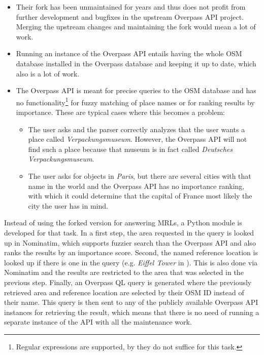 \begin{itemize}
\item Their fork has been unmaintained for years and thus does not profit from
  further development and bugfixes in the upstream Overpass API project. Merging
  the upstream changes and maintaining the fork would mean a lot of work.
\item Running an instance of the Overpass API entails having the whole OSM
  database installed in the Overpass database and keeping it up to date, which
  also is a lot of work.
\item The Overpass API is meant for precise queries to the OSM database and has
  no functionality\footnote{Regular expressions are supported, by they do not
    suffice for this task.} for fuzzy matching of place names or for ranking
  results by importance. These are typical cases where this becomes a problem:
  \begin{itemize}
  \item The user asks  and the parser
    correctly analyzes that the user wants a place called
    \emph{Verpackungsmuseum}. However, the Overpass API will not find such a
    place because that museum is in fact called \emph{Deutsches
      Verpackungsmuseum}.
  \item The user asks for objects in \emph{Paris}, but there are several cities
    with that name in the world and the Overpass API has no importance ranking,
    with which it could determine that the capital of France most likely the
    city the user has in mind.
  \end{itemize}
\end{itemize}

Instead of using the forked version for answering MRLs, a Python module is
developed for that task. In a first step, the area requested in the query is
looked up in Nominatim, which supports fuzzier search than the Overpass API and
also ranks the results by an importance score. Second, the named reference
location is looked up if there is one in the query (e.g. \emph{Eiffel Tower} in
). This is also done via Nominatim and the
results are restricted to the area that was selected in the previous step.
Finally, an Overpass QL query is generated where the previously retrieved area
and reference location are selected by their OSM ID instead of their name. This
query is then sent to any of the publicly available Overpass API instances for
retrieving the result, which means that there is no need of running a separate
instance of the API with all the maintenance work.

